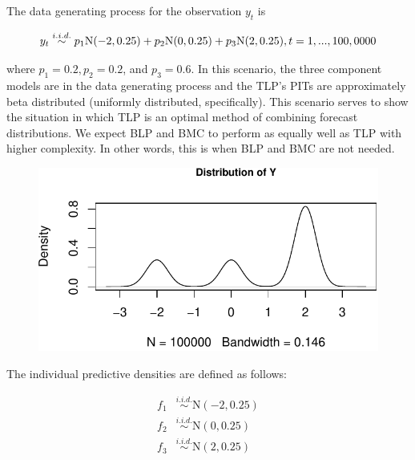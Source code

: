 \documentclass[
]{article}
\begin{document}
The data generating process for the observation \(y_t\) is

\[
y_t \overset{i.i.d.}{\sim} p_1\text{N}(-2,0.25)+p_2\text{N}(0,0.25)+p_3\text{N}(2,0.25), \\
t= 1,...,100,0000
\]

where \(p_1=0.2,p_2=0.2\), and \(p_3=0.6\). In this scenario, the three
component models are in the data generating process and the TLP's PITs
are approximately beta distributed (uniformly distributed,
specifically). This scenario serves to show the situation in which TLP
is an optimal method of combining forecast distributions. We expect BLP
and BMC to perform as equally well as TLP with higher complexity. In
other words, this is when BLP and BMC are not needed.

\begin{figure}[H]

{\centering \includegraphics{applied_blp_sim_files/figure-latex/unnamed-chunk-8-1} 

}

\end{figure}

The individual predictive densities are defined as follows:

\[
\begin{aligned}
f_{1}&\overset{i.i.d.}{\sim}\text{N}(-2,0.25)\\
f_{2}&\overset{i.i.d.}{\sim}\text{N}(0,0.25)\\
f_{3}&\overset{i.i.d.}{\sim}\text{N}(2,0.25)\\
\end{aligned}
\]
\end{document}
